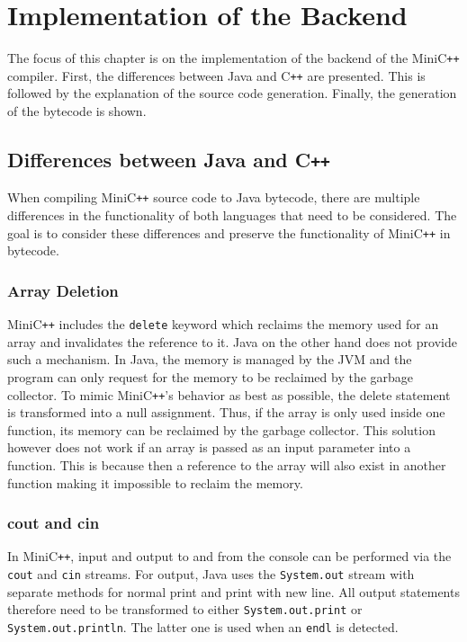 \chapter{Implementation of the Backend}

The focus of this chapter is on the implementation of the backend of the MiniC\verb|++| compiler. First, the differences between Java and C\verb|++| are presented. This is followed by the explanation of the source code generation. Finally, the generation of the bytecode is shown.

\section{Differences between Java and C\texttt{++}}

When compiling MiniC\verb|++| source code to Java bytecode, there are multiple differences in the functionality of both languages that need to be considered. The goal is to consider these differences and preserve the functionality of MiniC\verb|++| in bytecode. 

\subsection{Array Deletion}

MiniC\verb|++| includes the \verb|delete| keyword which reclaims the memory used for an array and invalidates the reference to it. Java on the other hand does not provide such a mechanism. In Java, the memory is managed by the JVM and the program can only request for the memory to be reclaimed by the garbage collector. To mimic MiniC\verb|++|'s behavior as best as possible, the delete statement is transformed into a null assignment. Thus, if the array is only used inside one function, its memory can be reclaimed by the garbage collector. This solution however does not work if an array is passed as an input parameter into a function. This is because then a reference to the array will also exist in another function making it impossible to reclaim the memory.  

\subsection{cout and cin}

In MiniC\verb|++|, input and output to and from the console can be performed via the \verb|cout| and \verb|cin| streams. For output, Java uses the \verb|System.out| stream with separate methods for normal print and print with new line. All output statements therefore need to be transformed to either \verb|System.out.print| or \verb|System.out.println|. The latter one is used when an \verb|endl| is detected. 

